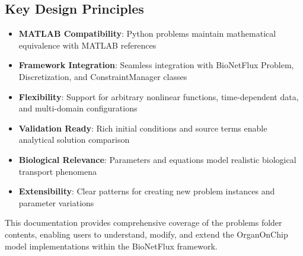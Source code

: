 \subsection{Key Design Principles}

\begin{itemize}
    \item \textbf{MATLAB Compatibility}: Python problems maintain mathematical equivalence with MATLAB references
    \item \textbf{Framework Integration}: Seamless integration with BioNetFlux Problem, Discretization, and ConstraintManager classes
    \item \textbf{Flexibility}: Support for arbitrary nonlinear functions, time-dependent data, and multi-domain configurations
    \item \textbf{Validation Ready}: Rich initial conditions and source terms enable analytical solution comparison
    \item \textbf{Biological Relevance}: Parameters and equations model realistic biological transport phenomena
    \item \textbf{Extensibility}: Clear patterns for creating new problem instances and parameter variations
\end{itemize}

This documentation provides comprehensive coverage of the problems folder contents, enabling users to understand, modify, and extend the OrganOnChip model implementations within the BioNetFlux framework.

